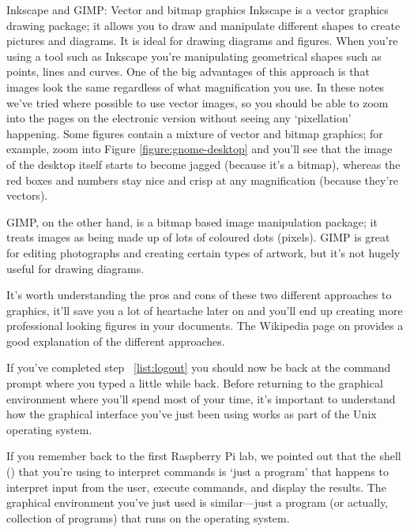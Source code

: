 \begin{diversion}{Inkscape and GIMP: Vector and bitmap graphics}
Inkscape is a vector graphics drawing package; it allows you to draw and manipulate different shapes to create pictures and diagrams. It is ideal for drawing diagrams and figures. When you're using a tool such as Inkscape you're manipulating geometrical shapes such as points, lines and curves. One of the big advantages of this approach is that images look the same regardless of what magnification you use. In these notes we've tried where possible to use vector images, so you should be able to zoom into the pages on the electronic version without seeing any `pixellation' happening. Some figures contain a mixture of vector and bitmap graphics; for example, zoom into Figure \ref{figure:gnome-desktop} and you'll see that the image of the desktop itself starts to become jagged (because it's a bitmap), whereas the red boxes and numbers stay nice and crisp at any magnification (because they're vectors).

GIMP, on the other hand, is a bitmap based image manipulation package; it treats images as being made up of lots of coloured dots (pixels). GIMP is great for editing photographs and creating certain types of artwork, but it's not hugely useful for drawing diagrams. 

It's worth understanding the pros and cons of these two different approaches to graphics, it'll save you a lot of heartache later on and you'll end up creating more professional looking figures in your documents. The Wikipedia page on  provides a good explanation of the different approaches.

\end{diversion}


If you've completed step ~\ref{list:logout} you should now be back at the command prompt where you typed  a little while back. Before returning to the graphical environment where you'll spend most of your time, it's important to understand how the graphical interface you've just been using works as part of the Unix operating system. 

If you remember back to the first Raspberry Pi lab, we pointed out that the shell () that you're using to interpret commands is `just a program' that happens to interpret input from the user, execute commands, and display the results. The graphical environment you've just used is similar---just a program (or actually, collection of programs) that runs on the operating system.

